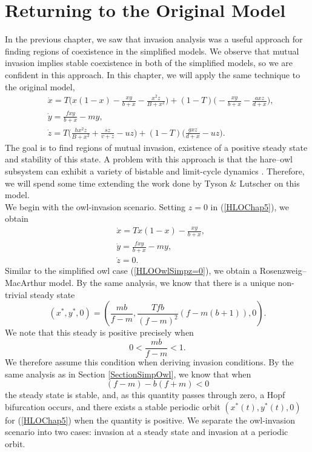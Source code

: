 \documentclass[12pt]{UOthesis}
\theoremstyle{remarkstyle}
\begin{document}
\pagebreak

\chapter{Returning to the Original Model}
\label{ChapterReturningOrigModel}

In the previous chapter, we saw that invasion analysis was a useful approach for finding regions of coexistence in the simplified models. We observe that mutual invasion implies stable coexistence in both of the simplified models, so we are confident in this approach. In this chapter, we will apply the same technique to the original model,
\begin{equation}
	\begin{split}
		&\dot{x}=T\Big(x(1-x)-\frac{xy}{b+x}-\frac{x^2 z}{B+x^2}\Big)+(1-T)\Big(-\frac{xy}{b+x}-\frac{axz}{d+x}\Big),\\
		&\dot{y}=\frac{fxy}{b+x}-my,\\
		&\dot{z}=T\Big(\frac{hx^2z}{B+x^2}+\frac{sz}{v+z}-uz\Big)+(1-T)\Big(\frac{gxz}{d+x}-uz\Big).
	\end{split}
	\label{HLOChap5}
\end{equation}
The goal is to find regions of mutual invasion, existence of a positive steady state and stability of this state. A problem with this approach is that the hare--owl subsystem can exhibit a variety of bistable and limit-cycle dynamics \cite{TysonLutscher}. Therefore, we will spend some time extending the work done by Tyson \& Lutscher on this model.\\

We begin with the owl-invasion scenario. Setting $z=0$ in (\ref{HLOChap5}), we obtain
\begin{equation}
	\begin{split}
		&\dot{x}=Tx(1-x)-\frac{xy}{b+x},\\
		&\dot{y}=\frac{fxy}{b+x}-my,\\
		&\dot{z}=0.
	\end{split}
	\label{HLOz=0}
\end{equation}
Similar to the simplified owl case (\ref{HLOOwlSimpz=0}), we obtain a Rosenzweig--MacArthur model. By the same analysis, we know that there is a unique non-trivial steady state
\begin{equation}
	(x^*,y^*,0)=\left(\frac{mb}{f-m},\frac{Tfb}{(f-m)^2}(f-m(b+1)),0\right).
	\label{HLORMSS}
\end{equation}
We note that this steady is positive precisely when
$$0<\frac{mb}{f-m}<1.$$
We therefore assume this condition when deriving invasion conditions. By the same analysis as in Section \ref{SectionSimpOwl}, we know that when
\begin{equation}
	(f-m)-b(f+m)<0
	\label{HLORMCond}
\end{equation}
the steady state is stable, and, as this quantity passes through zero, a Hopf bifurcation occurs, and there exists a stable periodic orbit $(x^*(t),y^*(t),0)$ for (\ref{HLOChap5}) when the quantity is positive. We separate the owl-invasion scenario into two cases: invasion at a steady state and invasion at a periodic orbit.
\end{document}
